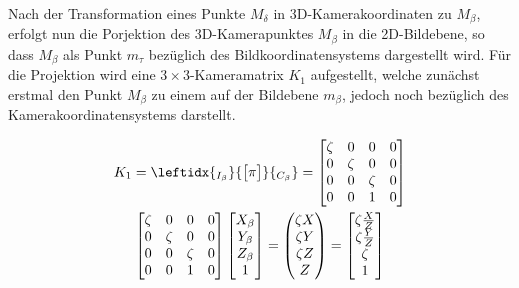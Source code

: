 Nach der Transformation eines Punkte $M_\delta$ in 3D-Kamerakoordinaten zu $M_\beta$, erfolgt nun die Porjektion des 3D-Kamerapunktes $M_\beta$ in die 2D-Bildebene, so dass $M_\beta$ als Punkt $m_\tau$ bezüglich des Bildkoordinatensystems dargestellt wird. Für die Projektion wird eine $3 \times 3$-Kameramatrix $K_1$ aufgestellt, welche zunächst erstmal den Punkt $M_\beta$ zu einem auf der Bildebene $m_\beta$, jedoch noch bezüglich des Kamerakoordinatensystems darstellt.  


\begin{gather}
	K_1 = 
	\leftidx{_{{I_\beta}}}{\begin{bmatrix}
			\pi
	\end{bmatrix}}{_{{C_\beta}}}
	=
	\begin{bmatrix}
		\zeta&0&0&0\\
		0&\zeta&0&0\\
		0&0&\zeta&0\\
		0&0&1&0
	\end{bmatrix}\\
	\begin{bmatrix}
		\zeta&0&0&0\\
		0&\zeta&0&0\\
		0&0&\zeta&0\\
		0&0&1&0
	\end{bmatrix}
	\begin{bmatrix}
		X_\beta\\Y_\beta\\Z_\beta\\1
	\end{bmatrix} =
	\begin{pmatrix}
		\zeta X\\ \zeta Y\\ \zeta Z \\ Z
	\end{pmatrix}
	=
	\begin{bmatrix}
		\zeta \frac{X}{Z}\\ \zeta \frac{Y}{Z}\\ \zeta  \\ 1
	\end{bmatrix}
\end{gather}

